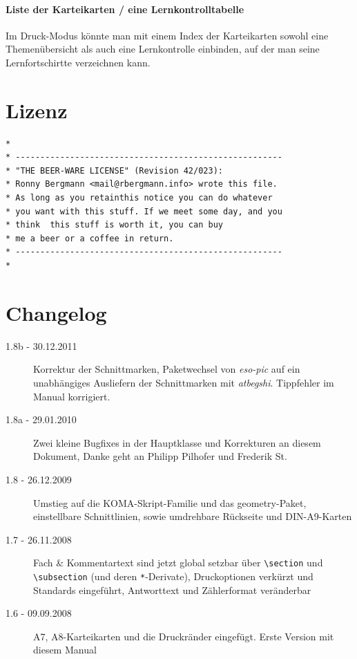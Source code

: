 \documentclass[a4paper,DIV=calc]{scrartcl}
\begin{document}
\paragraph{Liste der Karteikarten / eine Lernkontrolltabelle} 
Im Druck-Modus könnte man mit einem Index der Karteikarten sowohl eine Themenübersicht als auch eine Lernkontrolle einbinden, auf der man seine Lernfortschirtte verzeichnen kann.
\section{Lizenz}
\begin{lstlisting}[basicstyle=\sffamily, numbers=none]
*
* ------------------------------------------------------
* "THE BEER-WARE LICENSE" (Revision 42/023):
* Ronny Bergmann <mail@rbergmann.info> wrote this file.
* As long as you retainthis notice you can do whatever
* you want with this stuff. If we meet some day, and you
* think  this stuff is worth it, you can buy
* me a beer or a coffee in return. 
* ------------------------------------------------------
*
\end{lstlisting}
\newpage\section{Changelog}
\begin{description}
	\item[1.8b - 30.12.2011] Korrektur der Schnittmarken, Paketwechsel von \emph{eso-pic} auf ein unabhängiges Ausliefern der Schnittmarken mit \emph{atbegshi}. Tippfehler im Manual korrigiert.
	\item[1.8a - 29.01.2010] Zwei kleine Bugfixes in der Hauptklasse und Korrekturen an diesem Dokument, Danke geht an Philipp Pilhofer und Frederik St.
	\item[1.8 - 26.12.2009] Umstieg auf die KOMA-Skript-Familie und das geometry-Paket, einstellbare Schnittlinien, sowie umdrehbare Rückseite und DIN-A9-Karten
	\item[1.7 - 26.11.2008] Fach \& Kommentartext sind jetzt global setzbar über \lstinline!\section! und \lstinline!\subsection! (und deren \lstinline!*!-Derivate), Druckoptionen verkürzt und Standards eingeführt, Antworttext und Zählerformat veränderbar
	\item[1.6 - 09.09.2008] A7, A8-Karteikarten und die Druckränder eingefügt. Erste Version mit diesem Manual
\end{description}
\end{document}

